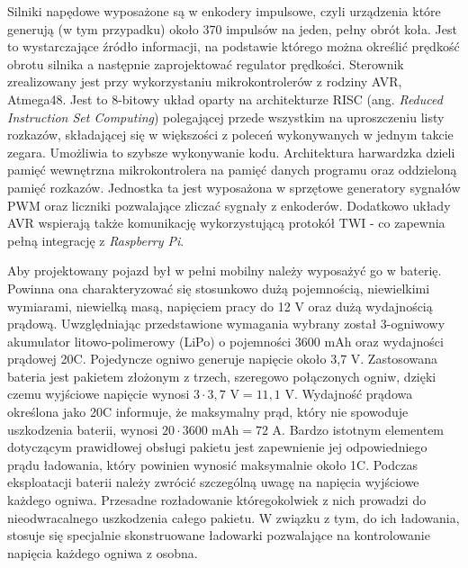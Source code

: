 Silniki napędowe wyposażone są w enkodery impulsowe, czyli  urządzenia które generują (w tym przypadku) około 370 impulsów na jeden, pełny obrót koła. Jest to wystarczające źródło informacji, na podstawie którego można określić prędkość obrotu silnika a następnie zaprojektować regulator prędkości. Sterownik zrealizowany jest przy wykorzystaniu mikrokontrolerów z rodziny AVR, Atmega48. Jest to 8-bitowy układ oparty na architekturze RISC (ang. \textit{Reduced Instruction Set Computing}) polegającej przede wszystkim na uproszczeniu listy rozkazów, składającej się w większości z poleceń wykonywanych w jednym takcie zegara. Umożliwia to szybsze wykonywanie kodu. Architektura harwardzka dzieli pamięć wewnętrzna mikrokontrolera na pamięć danych programu oraz oddzieloną pamięć rozkazów. Jednostka ta jest wyposażona w sprzętowe generatory sygnałów PWM oraz liczniki pozwalające zliczać sygnały z enkoderów. Dodatkowo układy AVR wspierają także komunikację wykorzystującą protokół TWI - co zapewnia pełną integrację z \textit{Raspberry Pi}.

Aby projektowany pojazd był w pełni mobilny należy wyposażyć go w baterię. Powinna ona charakteryzować się stosunkowo dużą pojemnością, niewielkimi wymiarami, niewielką masą, napięciem pracy do 12 V oraz dużą wydajnością prądową. Uwzględniając przedstawione wymagania wybrany został 3-ogniwowy akumulator litowo-polimerowy (LiPo) o pojemności 3600 mAh oraz wydajności prądowej 20C. Pojedyncze ogniwo generuje napięcie około 3,7 V. Zastosowana bateria jest pakietem złożonym z trzech, szeregowo połączonych ogniw, dzięki czemu wyjściowe napięcie wynosi $3\cdot3,7$ V$ = 11,1$ V. Wydajność prądowa określona jako 20C informuje, że maksymalny prąd, który nie spowoduje uszkodzenia baterii, wynosi $20\cdot3600$ mAh$=72$ A. Bardzo istotnym elementem dotyczącym prawidłowej obsługi pakietu jest zapewnienie jej odpowiedniego prądu ładowania, który powinien wynosić maksymalnie około 1C. Podczas eksploatacji baterii należy zwrócić szczególną uwagę na napięcia wyjściowe każdego ogniwa. Przesadne rozładowanie któregokolwiek z nich prowadzi do nieodwracalnego uszkodzenia całego pakietu. W związku z tym, do ich ładowania, stosuje się specjalnie skonstruowane ładowarki pozwalające na kontrolowanie napięcia każdego ogniwa z osobna.
